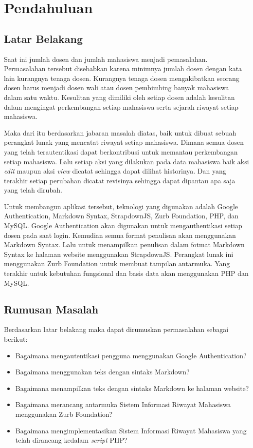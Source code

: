 \chapter{Pendahuluan}
\label{chap:pendahuluan}

\section{Latar Belakang}
\label{sec:latarbelakang}

Saat ini jumlah dosen dan jumlah mahasiswa menjadi pemasalahan. Permasalahan
tersebut disebabkan karena minimnya jumlah dosen dengan kata lain kurangnya
tenaga dosen. Kurangnya tenaga dosen mengakibatkan seorang dosen harus menjadi
dosen wali atau dosen pembimbing banyak mahasiswa dalam satu waktu. Kesulitan
yang dimiliki oleh setiap dosen adalah kesulitan dalam mengingat perkembangan
setiap mahasiswa serta sejarah riwayat setiap mahasiswa.

Maka dari itu berdasarkan jabaran masalah diatas, baik untuk dibuat sebuah
perangkat lunak yang mencatat riwayat setiap mahasiswa. Dimana semua dosen yang
telah terautentikasi dapat berkontribusi untuk memantau perkembangan setiap
mahasiswa. Lalu setiap aksi yang dilakukan pada data mahasiswa baik aksi {\it
edit} maupun aksi {\it view} dicatat sehingga dapat dilihat historinya. Dan yang
terakhir setiap perubahan dicatat revisinya sehingga dapat dipantau apa saja
yang telah dirubah.

Untuk membangun aplikasi tersebut, teknologi yang digunakan adalah Google
Authentication, Markdown Syntax, StrapdownJS, Zurb Foundation, PHP, dan MySQL.
Google Authentication akan digunakan untuk mengauthentikasi setiap dosen pada
saat login. Kemudian semua format penulisan akan menggunakan Markdown Syntax.
Lalu untuk menampilkan penulisan dalam fotmat Markdown Syntax ke halaman website
menggunakan StrapdownJS. Perangkat lunak ini menggunakan Zurb Foundation untuk
membuat tampilan antarmuka. Yang terakhir untuk kebutuhan fungsional dan basis
data akan menggunakan PHP dan MySQL.

\section{Rumusan Masalah}
Berdasarkan latar belakang maka dapat dirumuskan permasalahan sebagai berikut:
\begin{itemize}
	\item Bagaimana mengautentikasi pengguna menggunakan Google Authentication?
	\item Bagaimana menggunakan teks dengan sintaks Markdown?
	\item Bagaimana menampilkan teks dengan sintaks Markdown ke halaman website?
	\item Bagaimana merancang antarmuka Sistem Informasi Riwayat Mahasiswa
	menggunakan Zurb Foundation?
	\item Bagaimana mengimplementasikan Sistem Informasi Riwayat Mahasiswa yang
	telah dirancang kedalam {\it script} PHP?
\end{itemize}

